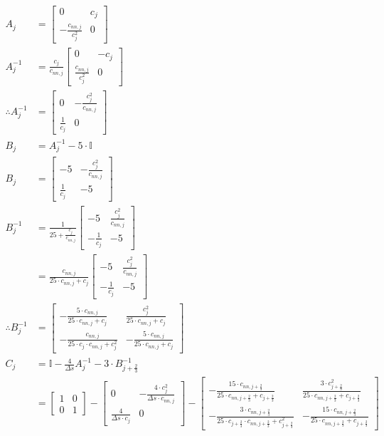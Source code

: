 \documentclass{article}
\begin{document}
\begin{align*}
  A_j &= \begin{bmatrix} 0 & c_j  \\ -\frac{c_{nn, j}}{c_j^2} & 0\end{bmatrix} \\
  A_j^{-1} &= \frac{c_j}{c_{nn, j}}\begin{bmatrix} 0 & -c_j  \\ \frac{c_{nn, j}}{c_j^2} & 0\end{bmatrix} \\
  \therefore A_j^{-1} &= \begin{bmatrix} 0 & -\frac{c^2_j}{c_{nn, j}}  \\ \frac{1}{c_j} & 0\end{bmatrix}\\
  B_j &= A_j^{-1} - 5\cdot\mathbb{I}\\
  B_j &= \begin{bmatrix} -5 & -\frac{c^2_j}{c_{nn, j}}  \\ \frac{1}{c_j} & -5 \end{bmatrix} \\
  B_j^{-1} &= \frac{1}{25 + \frac{c_j}{c_{nn, j}}}\begin{bmatrix} -5 & \frac{c^2_j}{c_{nn, j}}  \\ -\frac{1}{c_j} & -5 \end{bmatrix} \\
           &= \frac{c_{nn, j}}{25\cdot c_{nn, j} + c_j}\begin{bmatrix} -5 & \frac{c^2_j}{c_{nn, j}}  \\ -\frac{1}{c_j} & -5 \end{bmatrix}\\
  \therefore B_j^{-1} &= \begin{bmatrix} -\frac{5\cdot c_{nn, j}}{25\cdot c_{nn, j} + c_j} & \frac{c^2_j}{25\cdot c_{nn, j} + c_j}  \\ -\frac{c_{nn, j}}{25\cdot c_j\cdot c_{nn, j} + c_j^2} & -\frac{5\cdot c_{nn, j}}{25\cdot c_{nn, j} + c_j} \end{bmatrix}\\
  C_j &= \mathbb{I} - \frac{4}{\Delta s}A_j^{-1} - 3\cdot B_{j+\frac{2}{3}}^{-1}\\ 
      &= \begin{bmatrix} 1 & 0 \\ 0 & 1 \end{bmatrix} - \begin{bmatrix} 0 & -\frac{4\cdot c^2_j}{\Delta s\cdot c_{nn, j}}  \\ \frac{4}{\Delta s\cdot c_j} & 0\end{bmatrix} - \begin{bmatrix} -\frac{15\cdot c_{nn, j+\frac{2}{3}}}{25\cdot c_{nn, j+\frac{2}{3}} + c_{j+\frac{2}{3}}} & \frac{3\cdot c^2_{j+\frac{2}{3}}}{25\cdot c_{nn, j+\frac{2}{3}} + c_{j+\frac{2}{3}}}  \\ -\frac{3\cdot c_{nn, j+\frac{2}{3}}}{25\cdot c_{j+\frac{2}{3}}\cdot c_{nn, j+\frac{2}{3}} + c_{j+\frac{2}{3}}^2} & -\frac{15\cdot c_{nn, j+\frac{2}{3}}}{25\cdot c_{nn, j+\frac{2}{3}} + c_{j+\frac{2}{3}}} \end{bmatrix} \\

\end{align*}
\end{document}
